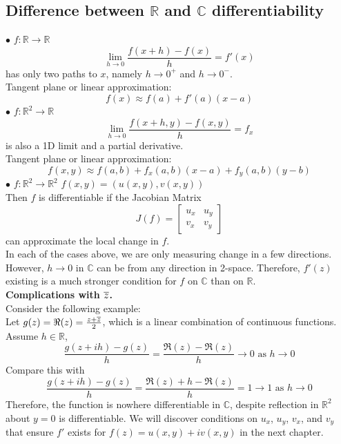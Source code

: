 \documentclass[11pt]{article}
\begin{document}
\subsection{Difference between $\mathbb{R}$ and $\mathbb{C}$ differentiability}
$\bullet$ $f: \mathbb{R} \to \mathbb{R}$ 
$$\lim_{h\to0}\frac{f(x+h) - f(x)}{h} = f'(x)$$ 
has only two paths to $x$, namely $h \to 0^+$ and $h \to 0^-$. \\ 
Tangent plane or linear approximation: 
$$f(x) \approx f(a) + f'(a)(x - a)$$
$\bullet$ $f: \mathbb{R}^2 \to \mathbb{R}$
$$\lim_{h\to0}\frac{f(x+h, y) - f(x, y)}{h} = f_x$$ 
is also a 1D limit and a partial derivative. \\
Tangent plane or linear approximation: 
$$f(x,y) \approx f(a,b) + f_x(a,b)(x - a) + f_y(a, b)(y - b)$$
$\bullet$ $f: \mathbb{R}^2 \to \mathbb{R}^2$ $f(x, y) = \left(u(x, y),v(x,y)\right)$ \\
Then $f$ is differentiable if the Jacobian Matrix
\begin{equation*}
J(f) = 
\begin{bmatrix}
 u_x & u_y \\
 v_x & v_y
\end{bmatrix}
\end{equation*}
can approximate the local change in $f$. \\
In each of the cases above, we are only measuring change in a few directions. However, $h \to0$ in $\mathbb{C}$ can be from any direction in 2-space. Therefore, $f'(z)$ existing is a much stronger condition for $f$ on $\mathbb{C}$ than on $\mathbb{R}$. \\
\newline
\textbf{Complications with $\overline{z}$.}\\
Consider the following example: \\
Let $g(z) = \Re(z) = \frac{z + \overline{z}}{2}$, which is a linear combination of continuous functions. \\
Assume $h \in \mathbb{R}$, 
\begin{equation*}
\frac{g(z + ih) - g(z)}{h} = \frac{\Re(z) - \Re(z)}{h} \to 0 \mbox{ as } h \to 0 
\end{equation*}
Compare this with 
\begin{equation*} 
\frac{g(z + ih) - g(z)}{h} = \frac{\Re(z) + h -\Re(z)}{h} = 1 \to 1 \mbox{ as } h \to 0
\end{equation*}
Therefore, the function is nowhere differentiable in $\mathbb{C}$, despite reflection in $\mathbb{R}^2$ about $y = 0$ is differentiable. We will discover conditions on $u_x$, $u_y$, $v_x$, and $v_y$ that ensure $f'$ exists for $f(z) = u(x, y) + iv(x, y)$ in the next chapter. 
\end{document}
